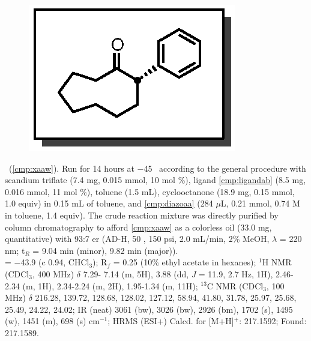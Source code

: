 \pagebreak
\begin{figure}
  \vspace{-23pt}
  \begin{center}
    \includegraphics[scale=0.8]{chp_asymmetric/images/xaaw}
  \end{center}
  \vspace{-30pt}
\end{figure}\noindent \textbf{\CMPxaaw}\ (\ref{cmp:xaaw}). Run for 14 hours
at $-$45 \degc\  according to the general procedure with scandium triflate (7.4
mg, 0.015 mmol, 10 mol \%), ligand \ref{cmp:ligandab} (8.5 mg, 0.016 mmol, 11
mol \%), toluene (1.5 mL), cyclooctanone (18.9 mg, 0.15 mmol, 1.0 equiv) in 0.15
mL of toluene, and \ref{cmp:diazoaa} (284 $\mu$L, 0.21 mmol, 0.74 M in toluene,
1.4 equiv). The crude reaction mixture was directly purified by column
chromatography to afford \ref{cmp:xaaw} as a colorless oil (33.0 mg,
quantitative) with 93:7 er (AD-H, 50 \degc, 150 psi, 2.0 mL/min, 2\% MeOH,
$\lambda$ = 220 nm; t$_R$ = 9.04 min (minor), 9.82 min (major)).\\
\rotation = $-$43.9 (c 0.94, CHCl$_3$); R$_f$ = 0.25 (10\% ethyl acetate in
hexanes); $^1$H NMR (CDCl$_3$, 400 MHz) $\delta$ 7.29- 7.14 (m, 5H), 3.88 (dd,
\textit{J} = 11.9, 2.7 Hz, 1H), 2.46-2.34 (m, 1H), 2.34-2.24 (m, 2H), 1.95-1.34
(m, 11H); $^{13}$C NMR (CDCl$_3$, 100 MHz) $\delta$ 216.28, 139.72, 128.68,
128.02, 127.12, 58.94, 41.80, 31.78, 25.97, 25.68, 25.49, 24.22, 24.02; IR
(neat) 3061 (bw), 3026 (bw), 2926 (bm), 1702 (s), 1495 (w), 1451 (m), 698 (s)
cm$^{-1}$; HRMS (ESI+) Calcd. for  [M+H]$^+$: 217.1592; Found:
217.1589.
\\
